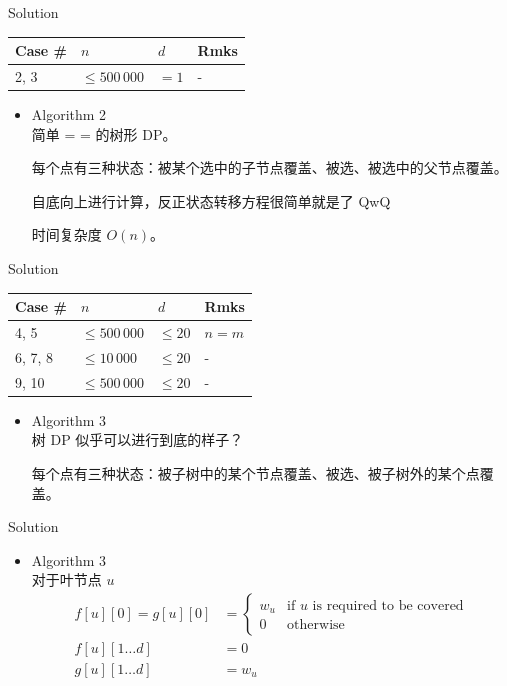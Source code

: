 \documentclass[UTF8]{beamer}
\begin{document}
\begin{frame}{Solution}

\begin{tabularx}{\textwidth}{X|X|X|X} \hline
Case \# & $n$ & $d$ & Rmks \\ \hline \hline
2, 3    & $\leq 500\,000$ & $= 1$     & - \\ \hline
\end{tabularx}
\begin{itemize}
    \item Algorithm 2 \\
        简单 = = 的树形 DP。

        每个点有三种状态：被某个选中的子节点覆盖、被选、被选中的父节点覆盖。

        自底向上进行计算，反正状态转移方程很简单就是了 QwQ

        时间复杂度 $O(n)$。
\end{itemize}

\end{frame}

\begin{frame}{Solution}

\begin{tabularx}{\textwidth}{X|X|X|X} \hline
Case \# & $n$ & $d$ & Rmks \\ \hline \hline
4, 5    & $\leq 500\,000$ & $\leq 20$ & $n = m$ \\ \hline
6, 7, 8 & $\leq 10\,000$  & $\leq 20$ & - \\ \hline
9, 10   & $\leq 500\,000$ & $\leq 20$ & - \\ \hline
\end{tabularx}
\begin{itemize}
    \item Algorithm 3 \\
        树 DP 似乎可以进行到底的样子？

        每个点有三种状态：被子树中的某个节点覆盖、被选、被子树外的某个点覆盖。
\end{itemize}

\end{frame}

\begin{frame}{Solution}

\begin{itemize}
    \item Algorithm 3 \\
        对于叶节点 $u$
        \begin{equation*}\begin{split}
            f[u][0] = g[u][0] &=
            \begin{cases}
                w_u &\mbox{if $u$ is required to be covered} \\
                0   &\mbox{otherwise}
            \end{cases} \\
            f[u][1 \dots d] &= 0 \\
            g[u][1 \dots d] &= w_u
        \end{split}\end{equation*}
\end{itemize}

\end{frame}
\end{document}

